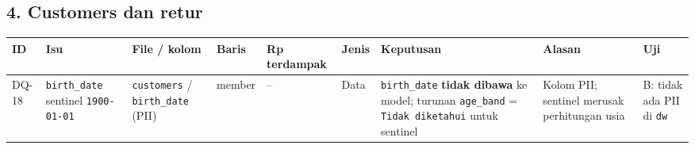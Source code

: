 \documentclass[10pt,a4paper]{article}
\begin{document}
\subsection{4. Customers dan retur}\label{customers-dan-retur}

{\def\LTcaptype{none} %
\begin{longtable}[]{@{}
  >{\raggedright\arraybackslash}p{}
  >{\raggedright\arraybackslash}p{}
  >{\raggedright\arraybackslash}p{}
  >{\raggedleft\arraybackslash}p{}
  >{\raggedleft\arraybackslash}p{}
  >{\raggedright\arraybackslash}p{}
  >{\raggedright\arraybackslash}p{}
  >{\raggedright\arraybackslash}p{}
  >{\raggedright\arraybackslash}p{}@{}}
\toprule\noalign{}
\begin{minipage}[b]{\linewidth}\raggedright
ID
\end{minipage} & \begin{minipage}[b]{\linewidth}\raggedright
Isu
\end{minipage} & \begin{minipage}[b]{\linewidth}\raggedright
File / kolom
\end{minipage} & \begin{minipage}[b]{\linewidth}\raggedleft
Baris
\end{minipage} & \begin{minipage}[b]{\linewidth}\raggedleft
Rp terdampak
\end{minipage} & \begin{minipage}[b]{\linewidth}\raggedright
Jenis
\end{minipage} & \begin{minipage}[b]{\linewidth}\raggedright
Keputusan
\end{minipage} & \begin{minipage}[b]{\linewidth}\raggedright
Alasan
\end{minipage} & \begin{minipage}[b]{\linewidth}\raggedright
Uji
\end{minipage} \\
\midrule\noalign{}
\endhead
\bottomrule\noalign{}
\endlastfoot
DQ-18 & \texttt{birth\_\allowbreak{}date} sentinel \texttt{1900-01-01} & \texttt{customers} / \texttt{birth\_\allowbreak{}date} (PII) & 418 member & -- & Data & \texttt{birth\_\allowbreak{}date} \textbf{tidak dibawa} ke model; turunan \texttt{age\_\allowbreak{}band} = \texttt{Tidak\ diketahui} untuk sentinel & Kolom PII; sentinel merusak perhitungan usia & B: tidak ada PII di \texttt{dw} \\

\end{longtable}}
\end{document}
